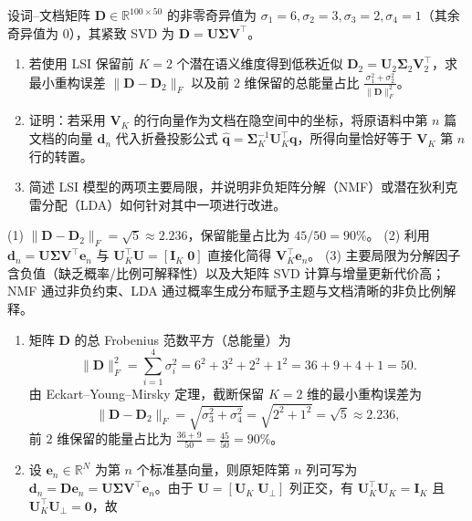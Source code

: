 \begin{exercise}[title={LSI 截断 SVD 重构误差计算与折叠投影证明},level=advanced,points=20,tags={LSI,奇异值分解,低秩近似}]\label{ex:ch07-lsi-math}
设词--文档矩阵 $\mathbf{D}\in\mathbb{R}^{100\times 50}$ 的非零奇异值为 $\sigma_1=6, \sigma_2=3, \sigma_3=2, \sigma_4=1$（其余奇异值为 $0$），其紧致 SVD 为 $\mathbf{D}=\mathbf{U}\boldsymbol{\Sigma}\mathbf{V}^\top$。
\begin{enumerate}
  \item 若使用 LSI 保留前 $K=2$ 个潜在语义维度得到低秩近似 $\mathbf{D}_2=\mathbf{U}_2\boldsymbol{\Sigma}_2\mathbf{V}_2^\top$，求最小重构误差 $\|\mathbf{D}-\mathbf{D}_2\|_F$ 以及前 $2$ 维保留的总能量占比 $\frac{\sigma_1^2+\sigma_2^2}{\|\mathbf{D}\|_F^2}$。
  \item 证明：若采用 $\mathbf{V}_K$ 的行向量作为文档在隐空间中的坐标，将原语料中第 $n$ 篇文档的向量 $\mathbf{d}_n$ 代入折叠投影公式 $\hat{\mathbf{q}}=\boldsymbol{\Sigma}_K^{-1}\mathbf{U}_K^\top\mathbf{q}$，所得向量恰好等于 $\mathbf{V}_K$ 第 $n$ 行的转置。
  \item 简述 LSI 模型的两项主要局限，并说明非负矩阵分解（NMF）或潜在狄利克雷分配（LDA）如何针对其中一项进行改进。
\end{enumerate}
\begin{answer}
(1) $\|\mathbf{D}-\mathbf{D}_2\|_F = \sqrt{5} \approx 2.236$，保留能量占比为 $45/50 = 90\%$。
(2) 利用 $\mathbf{d}_n=\mathbf{U}\boldsymbol{\Sigma}\mathbf{V}^\top\mathbf{e}_n$ 与 $\mathbf{U}_K^\top\mathbf{U}=[\mathbf{I}_K\;\mathbf{0}]$ 直接化简得 $\mathbf{V}_K^\top\mathbf{e}_n$。
(3) 主要局限为分解因子含负值（缺乏概率/比例可解释性）以及大矩阵 SVD 计算与增量更新代价高；NMF 通过非负约束、LDA 通过概率生成分布赋予主题与文档清晰的非负比例解释。
\end{answer}
\begin{solution}
\begin{enumerate}
  \item 矩阵 $\mathbf{D}$ 的总 Frobenius 范数平方（总能量）为
  \[
    \|\mathbf{D}\|_F^2 = \sum_{i=1}^{4} \sigma_i^2 = 6^2 + 3^2 + 2^2 + 1^2 = 36 + 9 + 4 + 1 = 50.
  \]
  由 Eckart--Young--Mirsky 定理，截断保留 $K=2$ 维的最小重构误差为
  \[
    \|\mathbf{D}-\mathbf{D}_2\|_F = \sqrt{\sigma_3^2 + \sigma_4^2} = \sqrt{2^2 + 1^2} = \sqrt{5} \approx 2.236,
  \]
  前 $2$ 维保留的能量占比为 $\frac{36+9}{50}=\frac{45}{50}=90\%$。
  \item 设 $\mathbf{e}_n\in\mathbb{R}^N$ 为第 $n$ 个标准基向量，则原矩阵第 $n$ 列可写为 $\mathbf{d}_n = \mathbf{D}\mathbf{e}_n = \mathbf{U}\boldsymbol{\Sigma}\mathbf{V}^\top\mathbf{e}_n$。由于 $\mathbf{U}=[\mathbf{U}_K\;\mathbf{U}_{\perp}]$ 列正交，有 $\mathbf{U}_K^\top\mathbf{U}_K=\mathbf{I}_K$ 且 $\mathbf{U}_K^\top\mathbf{U}_{\perp}=\mathbf{0}$，故

\end{enumerate}
\end{solution}
\end{exercise}
